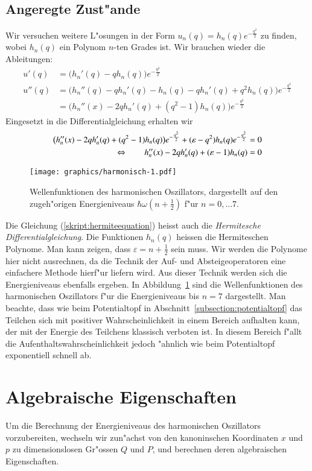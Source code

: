 \subsection{Angeregte Zust"ande}
Wir versuchen weitere L"osungen in der Form $u_n(q)=h_n(q)e^{-\frac{q^2}2}$
zu finden, wobei $h_n(q)$ ein Polynom $n$-ten Grades ist.
Wir brauchen wieder die Ableitungen:
\begin{align*}
u'(q)
&=
\bigl(h_n'(q)- qh_n(q)\bigr)e^{-\frac{q^2}2}
\\
u''(q)
&=
\bigl(
h_n''(q)- qh_n'(q)
- h_n(q)
- q h_n'(q)
+q^2h_n(q)
\bigr)e^{-\frac{q^2}2}
\\
&=
\bigl(
h_n''(x)-2 qh_n'(q)
+(q^2-1)h_n(q)
\bigr)e^{-\frac{q^2}2}
\end{align*}
Eingesetzt in die Differentialgleichung erhalten wir
\begin{align}
\bigl(
h_n''(x)-2 qh_n'(q)
+(q^2-1)h_n(q)
\bigr)e^{-\frac{q^2}2}
+(\varepsilon-q^2)h_n(q)e^{-\frac{q^2}2}&=0
\notag
\\
\Leftrightarrow\qquad
h_n''(x)-2 qh_n'(q)
+(\varepsilon - 1)h_n(q)&=0
\label{skript:hermiteequation}
\end{align}
\begin{figure}
\centering
\texttt{[image: graphics/harmonisch-1.pdf]}
\caption{Wellenfunktionen des harmonischen Oszillators, dargestellt auf
den zugeh"origen Energieniveaus $\hbar \omega (n+\frac12)$ f"ur
$n=0,\dots 7$.
\label{skript:harmonisch-wellenfunktionen}}
\end{figure}%
Die Gleichung (\ref{skript:hermiteequation}) heisst auch die 
{\em Hermitesche Differentialgleichung}.
Die Funktionen $h_n(q)$ heissen die Hermiteschen Polynome.
Man kann zeigen, dass $\varepsilon=n+\frac12$ sein muss.
Wir werden die Polynome hier nicht ausrechnen, da die Technik der
Auf- und Absteigeoperatoren eine einfachere Methode hierf"ur liefern
wird.
Aus dieser Technik werden sich die Energieniveaus ebenfalls ergeben.
In Abbildung~\ref{skript:harmonisch-wellenfunktionen} sind die Wellenfunktionen
des harmonischen Oszillators f"ur die Energieniveaus bis $n=7$ dargestellt.
Man beachte, dass wie beim Potentialtopf in
Abschnitt~\ref{subsection:potentialtopf} das Teilchen sich mit positiver
Wahrscheinlichkeit in einem Bereich aufhalten kann, der mit der Energie
des Teilchens klassisch verboten ist.
In diesem Bereich f"allt die Aufenthaltswahrscheinlichkeit jedoch
"ahnlich wie beim Potentialtopf exponentiell schnell ab.

\section{Algebraische Eigenschaften}
Um die Berechnung der Energieniveaus des harmonischen Oszillators
vorzubereiten, wechseln wir zun"achst von den kanoninschen Koordinaten
$x$ und $p$ zu dimensionslosen Gr"ossen $Q$ und $P$, und berechnen
deren algebraischen Eigenschaften.
